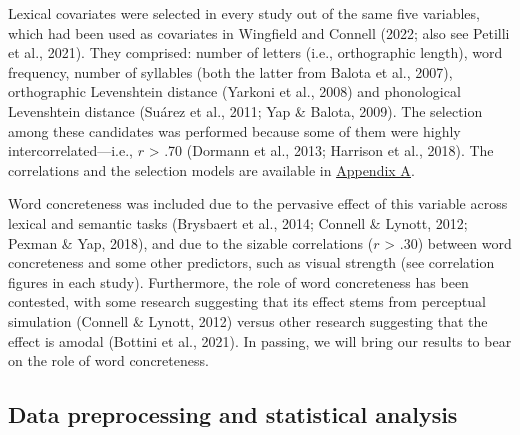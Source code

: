 \documentclass[
  12pt,
  man,floatsintext]{apa7}
\begin{document}
Lexical covariates were selected in every study out of the same five variables, which had been used as covariates in Wingfield and Connell (2022; also see Petilli et al., 2021). They comprised: number of letters (i.e., orthographic length), word frequency, number of syllables (both the latter from Balota et al., 2007), orthographic Levenshtein distance (Yarkoni et al., 2008) and phonological Levenshtein distance (Suárez et al., 2011; Yap \& Balota, 2009). The selection among these candidates was performed because some of them were highly intercorrelated---i.e., \(r\) \textgreater{} .70 (Dormann et al., 2013; Harrison et al., 2018). The correlations and the selection models are available in \protect\hyperlink{appendix-A-lexical-covariates}{\underline{Appendix A}}.

Word concreteness was included due to the pervasive effect of this variable across lexical and semantic tasks (Brysbaert et al., 2014; Connell \& Lynott, 2012; Pexman \& Yap, 2018), and due to the sizable correlations (\(r\) \textgreater{} .30) between word concreteness and some other predictors, such as visual strength (see correlation figures in each study). Furthermore, the role of word concreteness has been contested, with some research suggesting that its effect stems from perceptual simulation (Connell \& Lynott, 2012) versus other research suggesting that the effect is amodal (Bottini et al., 2021). In passing, we will bring our results to bear on the role of word concreteness.

\hypertarget{data-preprocessing-and-statistical-analysis}{%
\subsection{Data preprocessing and statistical analysis}\label{data-preprocessing-and-statistical-analysis}}
\end{document}
